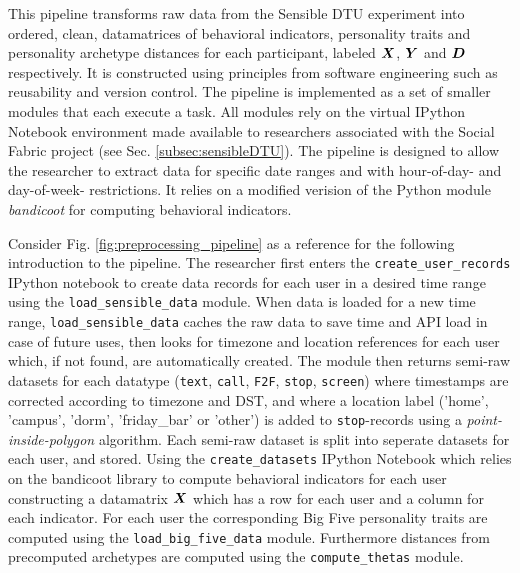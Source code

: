 This pipeline transforms raw data from the Sensible DTU experiment into ordered, clean, datamatrices of behavioral indicators, personality traits and personality archetype distances for each participant, labeled $\bm{X}$, $\bm{Y}$ and $\bm{D}$ respectively. It is constructed using principles from software engineering such as reusability and version control. The pipeline is implemented as a set of smaller modules that each execute a task. All modules rely on the virtual IPython Notebook environment made available to researchers associated with the Social Fabric project (see Sec. \ref{subsec:sensibleDTU}). The pipeline is designed to allow the researcher to extract data for specific date ranges and with hour-of-day- and day-of-week- restrictions. It relies on a modified verision of the Python module \textit{bandicoot} for computing behavioral indicators. 

Consider Fig. \ref{fig:preprocessing_pipeline} as a reference for the following introduction to the pipeline. The researcher first enters the \texttt{create\_user\_records} IPython notebook to create data records for each user in a desired time range using the \texttt{load\_sensible\_data} module. When data is loaded for a new time range, \texttt{load\_sensible\_data} caches the raw data to save time and API load in case of future uses, then looks for timezone and location references for each user which, if not found, are automatically created. The module then returns semi-raw datasets for each datatype (\texttt{text}, \texttt{call}, \texttt{F2F}, \texttt{stop}, \texttt{screen}) where timestamps are corrected according to timezone and DST, and where a location label ('home', 'campus', 'dorm', 'friday\_bar' or 'other') is added to \texttt{stop}-records using a \textit{point-inside-polygon} algorithm. Each semi-raw dataset is split into seperate datasets for each user, and stored. Using the \texttt{create\_datasets} IPython Notebook which relies on the bandicoot library to compute behavioral indicators for each user constructing a datamatrix $\bm{X}$ which has a row for each user and a column for each indicator. For each user the corresponding Big Five personality traits are computed using the \texttt{load\_big\_five\_data} module. Furthermore distances from precomputed archetypes are computed using the \texttt{compute\_thetas} module.


